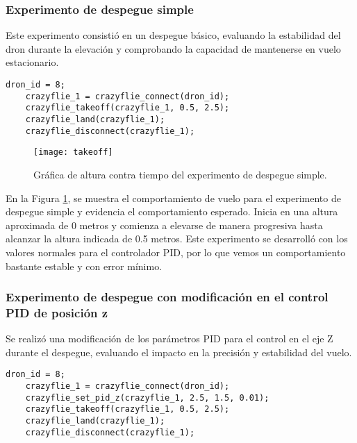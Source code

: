 \subsubsection{Experimento de despegue simple}
Este experimento consistió en un despegue básico, evaluando la estabilidad del dron durante la elevación y comprobando la capacidad de mantenerse en vuelo estacionario.
\vspace{5mm}
\begin{lstlisting}[caption=Algoritmo de experimento de despegue simple con Crazyflie en Matlab., label=code:prueba1_matlab]
	dron_id = 8; 
	crazyflie_1 = crazyflie_connect(dron_id);
	crazyflie_takeoff(crazyflie_1, 0.5, 2.5);
	crazyflie_land(crazyflie_1);
	crazyflie_disconnect(crazyflie_1);
\end{lstlisting}

\begin{figure}[htbp]
	\centering
	\texttt{[image: takeoff]}
	\caption{Gráfica de altura contra tiempo del experimento de despegue simple.}
	\label{fig:takeoff}
\end{figure} 

En la Figura \ref{fig:takeoff}, se muestra el comportamiento de vuelo para el experimento de despegue simple y evidencia el comportamiento esperado. Inicia en una altura aproximada de 0 metros y comienza a elevarse de manera progresiva hasta alcanzar la altura indicada de 0.5 metros. Este experimento se desarrolló con los valores normales para el controlador PID, por lo que vemos un comportamiento bastante estable y con error mínimo. 

\subsubsection{Experimento de despegue con modificación en el control PID de posición z}
Se realizó una modificación de los parámetros PID para el control en el eje Z durante el despegue, evaluando el impacto en la precisión y estabilidad del vuelo.
\vspace{5mm}
\begin{lstlisting}[caption=Algoritmo de experimento de despegue con modificación en el control PID de altura con Crazyflie en Matlab., label=code:prueba2_matlab]
	dron_id = 8;    
	crazyflie_1 = crazyflie_connect(dron_id);
	crazyflie_set_pid_z(crazyflie_1, 2.5, 1.5, 0.01);
	crazyflie_takeoff(crazyflie_1, 0.5, 2.5);
	crazyflie_land(crazyflie_1);
	crazyflie_disconnect(crazyflie_1);
\end{lstlisting}

